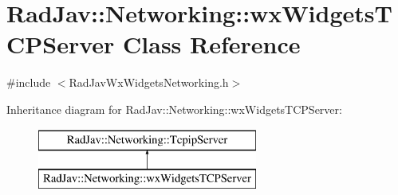 \hypertarget{class_rad_jav_1_1_networking_1_1wx_widgets_t_c_p_server}{}\section{Rad\+Jav\+:\+:Networking\+:\+:wx\+Widgets\+T\+C\+P\+Server Class Reference}
\label{class_rad_jav_1_1_networking_1_1wx_widgets_t_c_p_server}


{\ttfamily \#include $<$Rad\+Jav\+Wx\+Widgets\+Networking.\+h$>$}

Inheritance diagram for Rad\+Jav\+:\+:Networking\+:\+:wx\+Widgets\+T\+C\+P\+Server\+:\begin{figure}[H]
\begin{center}
\leavevmode
\includegraphics[height=2.000000cm]{class_rad_jav_1_1_networking_1_1wx_widgets_t_c_p_server}
\end{center}
\end{figure}
